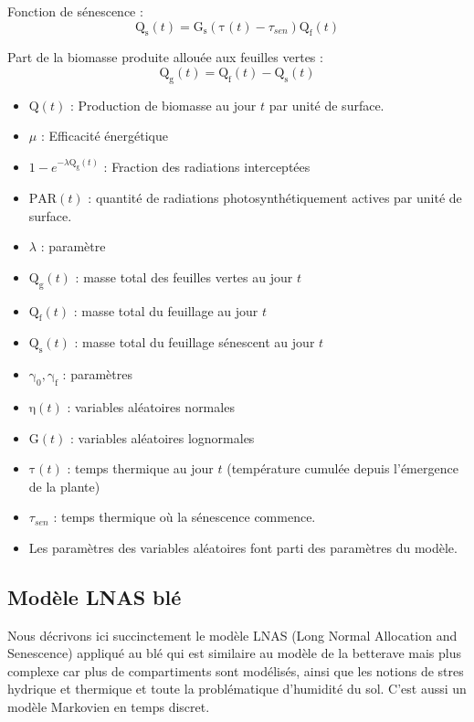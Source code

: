 Fonction de sénescence :
 \[ \mathrm{Q_s}(t) = \mathrm{G_s}(\mathrm{\tau}(t)- \tau_{sen})\mathrm{Q_f}(t) \]
 
Part de la biomasse produite allouée aux feuilles vertes :
 \[\mathrm{Q_g}(t) = \mathrm{Q_f}(t) - \mathrm{Q_s}(t) \]
 
 \begin{itemize}
 
 \item $\mathrm{Q}(t)$ : Production de biomasse au jour $t$ par unité de surface.
 \item $\mu$ : Efficacité énergétique
 \item $1-e^{-\lambda\mathrm{Q_g}(t)}$ : Fraction des radiations interceptées
 \item $\mathrm{PAR}(t)$ : quantité de radiations photosynthétiquement actives par unité de surface.
 \item $\lambda$ : paramètre
 \item $\mathrm{Q_g}(t)$ : masse total des feuilles vertes au jour $t$
 \item $\mathrm{Q_f}(t)$ : masse total du feuillage au jour $t$
 \item $\mathrm{Q_s}(t)$ : masse total du feuillage sénescent au jour $t$ 
 \item $\mathrm{\gamma_0}, \mathrm{\gamma_f}$ : paramètres
 \item $\mathrm{\eta}(t)$ : variables aléatoires normales 
 \item $\mathrm{G}(t)$ : variables aléatoires lognormales
 \item $\mathrm{\tau}(t)$ : temps thermique au jour $t$ (température cumulée depuis l'émergence de la plante)
 \item $\tau_{sen}$ : temps thermique où la sénescence commence.
 \item Les paramètres des variables aléatoires font parti des paramètres du modèle.
 
 \end{itemize}
 
\subsection{Modèle LNAS blé}
Nous décrivons ici succinctement le modèle LNAS (Long Normal Allocation and Senescence) appliqué au blé qui est similaire au modèle de la betterave mais plus complexe car plus de compartiments sont modélisés, ainsi que les notions de stres hydrique et thermique et toute la problématique d'humidité du sol. 
C’est aussi un modèle Markovien en temps discret.

